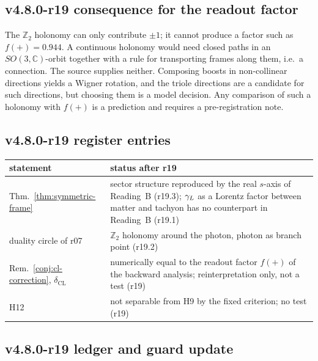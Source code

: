 \subsection*{v4.8.0-r19 consequence for the readout factor}
\label{subsec:v480-r19-readout-factor}

The \(\mathbb Z_2\) holonomy can only contribute \(\pm1\); it cannot produce a factor such as \(f(+)=0.944\).  A
continuous holonomy would need closed paths in an \(SO(3,\mathbb C)\)-orbit together with a rule for transporting
frames along them, i.e.\ a connection.  The source supplies neither.  Composing boosts in non-collinear directions
yields a Wigner rotation, and the triole directions are a candidate for such directions, but choosing them is a model
decision.  Any comparison of such a holonomy with \(f(+)\) is a prediction and requires a pre-registration note.

\subsection*{v4.8.0-r19 register entries}
\label{subsec:v480-r19-register}

\begin{center}
\small
\begin{tabular}{@{}>{\raggedright\arraybackslash}p{}>{\raggedright\arraybackslash}p{}@{}}
\toprule
statement & status after r19\\
\midrule
Thm.~\ref{thm:symmetric-frame} & sector structure reproduced by the real \(s\)-axis of Reading~B (r19.3); \(\gamma_L\) as a Lorentz factor between matter and tachyon has no counterpart in Reading~B (r19.1)\\
duality circle of r07 & \(\mathbb Z_2\) holonomy around the photon, photon as branch point (r19.2)\\
Rem.~\ref{conj:cl-correction}, \(\delta_{\mathrm{CL}}\) & numerically equal to the readout factor \(f(+)\) of the backward analysis; reinterpretation only, not a test (r19)\\
H12 & not separable from H9 by the fixed criterion; no test (r19)\\
\bottomrule
\end{tabular}
\end{center}

\subsection*{v4.8.0-r19 ledger and guard update}
\label{subsec:v480-r19-ledger-guard}

